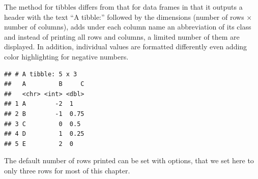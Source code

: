 \documentclass[krantz2]{krantz}\usepackage{knitr}
\begin{document}
\begin{explainbox}
  The  method for tibbles differs from that for data frames in that it outputs a header with the text ``A tibble:'' followed by the dimensions (number of rows $\times$ number of columns), adds under each column name an abbreviation of its class and instead of printing all rows and columns, a limited number of them are displayed. In addition, individual values are formatted differently even adding color highlighting for negative numbers.

\begin{knitrout}\footnotesize
{}\color{fgcolor}\begin{kframe}
\begin{alltt}
\hlstd{(} \hlstd{= LETTERS[}\hlopt{:}\hlstd{],}  \hlstd{=} \hlopt{-}\hlopt{:}\hlstd{,}  \hlstd{=} \hlstd{(} \hlstd{=} \hlstd{,}  \hlstd{=} \hlstd{,}  \hlstd{=} \hlstd{))}
\end{alltt}
\begin{verbatim}
## # A tibble: 5 x 3
##   A         B     C
##   <chr> <int> <dbl>
## 1 A        -2  1
## 2 B        -1  0.75
## 3 C         0  0.5
## 4 D         1  0.25
## 5 E         2  0
\end{verbatim}
\end{kframe}
\end{knitrout}

The default number of rows printed can be set with options, that we set here to only three rows for most of this chapter.

\begin{knitrout}\footnotesize
{}\color{fgcolor}\begin{kframe}
\begin{alltt}
\hlstd{(} \hlstd{=} \hlstd{,}  \hlstd{=} \hlstd{)}
\end{alltt}
\end{kframe}
\end{knitrout}
\end{explainbox}
\end{document}
